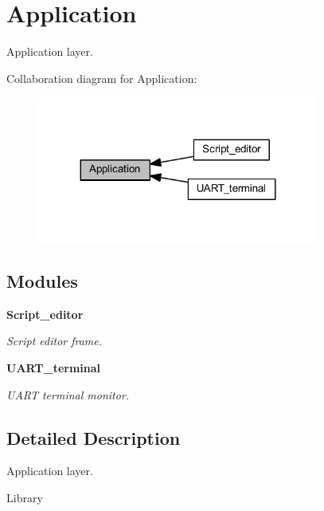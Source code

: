 \section{Application}
\label{group___application}


Application layer.  


Collaboration diagram for Application\+:
\nopagebreak
\begin{figure}[H]
\begin{center}
\leavevmode
\includegraphics[width=263pt]{group___application}
\end{center}
\end{figure}
\subsection*{Modules}
\begin{DoxyCompactItemize}
\item 
\textbf{ Script\+\_\+editor}
\begin{DoxyCompactList}\small\item\em Script editor frame. \end{DoxyCompactList}\item 
\textbf{ U\+A\+R\+T\+\_\+terminal}
\begin{DoxyCompactList}\small\item\em U\+A\+RT terminal monitor. \end{DoxyCompactList}\end{DoxyCompactItemize}


\subsection{Detailed Description}
Application layer. 

Library 